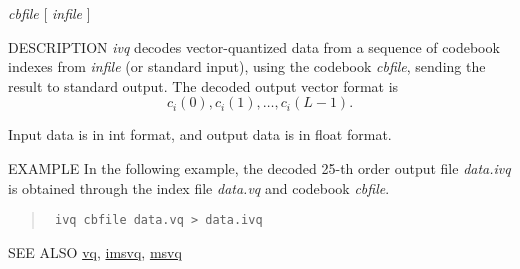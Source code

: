 \begin{synopsis}
\item [ivq] [ --l $L$ ] [ --n $N$ ] {\em cbfile}  [ {\em infile} ] 
\end{synopsis}

\begin{qsection}{DESCRIPTION}
{\em ivq} decodes vector-quantized data from a sequence of codebook indexes
from {\em infile} (or standard input), 
using the codebook {\em cbfile}, 
sending the result to standard output. 
The decoded output vector format is
\begin{displaymath}
  c_i(0),c_i(1),\dots,c_i(L-1). 
\end{displaymath}

Input data is in int format, and output data is in float format.
\end{qsection}

\begin{options}
\end{options}

\begin{qsection}{EXAMPLE}
In the following example,
the decoded 25-th order output file {\em data.ivq} is obtained
through the index file {\em data.vq} and codebook {\em cbfile}.
\begin{quote}
\verb! ivq cbfile data.vq > data.ivq !
\end{quote}
\end{qsection}

\begin{qsection}{SEE ALSO}
\hyperlink{vq}{vq},
\hyperlink{imsvq}{imsvq},
\hyperlink{msvq}{msvq}
\end{qsection}
